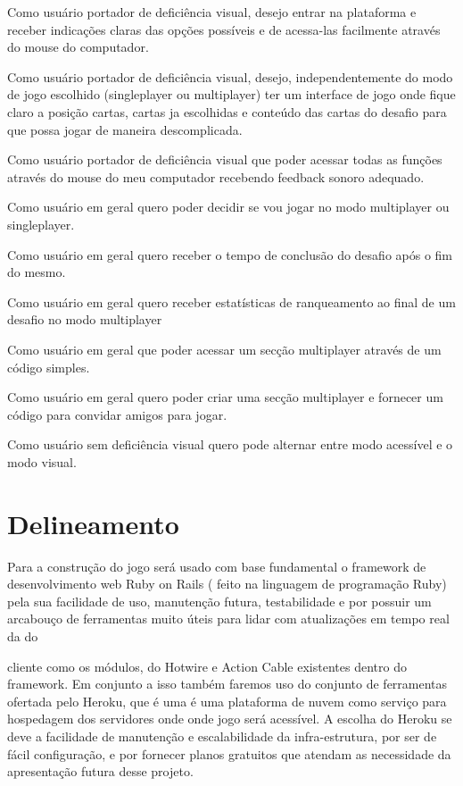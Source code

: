 \begin{alineascomnumero}
  \item Como usuário portador de deficiência visual, desejo entrar na plataforma e receber indicações claras das opções possíveis e de acessa-las facilmente através do mouse do computador.
  \item Como usuário portador de deficiência visual, desejo, independentemente do modo de jogo escolhido (singleplayer ou multiplayer) ter um interface de jogo onde fique claro a posição cartas, cartas ja escolhidas e conteúdo das cartas do desafio para que possa jogar de maneira descomplicada.
  \item Como usuário portador de deficiência visual que poder acessar todas as funções através do mouse do meu computador recebendo feedback sonoro adequado.
  \item Como usuário em geral quero poder decidir se vou jogar no modo multiplayer ou singleplayer.
  \item Como usuário em geral quero receber o tempo de conclusão do desafio após o fim do mesmo.
  \item Como usuário em geral quero receber estatísticas de ranqueamento ao final de um desafio no modo multiplayer
  \item Como usuário em geral que poder acessar um secção multiplayer através de um código simples.
  \item Como usuário em geral quero poder criar uma secção multiplayer e fornecer um código para convidar amigos para jogar.
  \item Como usuário sem deficiência visual quero pode alternar entre modo acessível e o modo visual.
\end{alineascomnumero}


\section{Delineamento}
Para a construção do jogo será usado com base fundamental o framework de desenvolvimento web Ruby on Rails ( feito na linguagem de programação Ruby) pela sua facilidade de uso, manutenção futura, testabilidade e por possuir um arcabouço de ferramentas muito úteis para lidar com atualizações em tempo real da do

cliente como os módulos, do Hotwire e Action Cable existentes dentro do framework.
Em conjunto a isso também faremos uso do conjunto de ferramentas ofertada pelo Heroku, que é uma é uma plataforma de nuvem como serviço para hospedagem dos servidores onde onde jogo será acessível. A escolha do Heroku se deve a facilidade de manutenção e escalabilidade da infra-estrutura, por ser de fácil configuração, e por fornecer planos gratuitos que atendam as necessidade da apresentação futura desse projeto.

